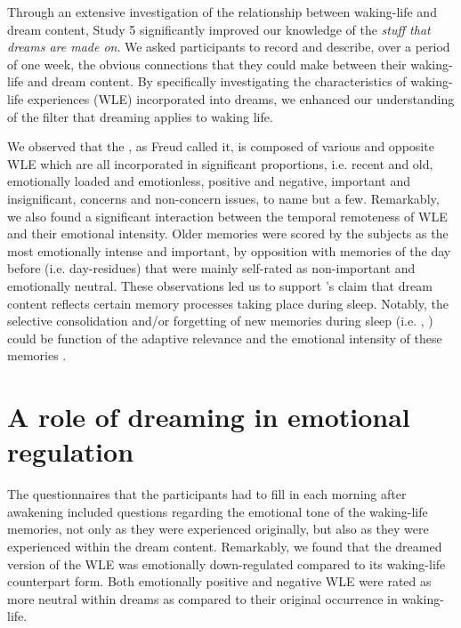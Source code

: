 
Through an extensive investigation of the relationship between waking-life and dream content, Study 5 significantly improved our knowledge of the \emph{stuff that dreams are made on}. We asked participants to record and describe, over a period of one week, the obvious connections that they could make between their waking-life and dream content. By specifically investigating the characteristics of waking-life experiences (WLE) incorporated into dreams, we enhanced our understanding of the filter that dreaming applies to waking life.

We observed that the , as Freud called it, is composed of various and opposite WLE which are all incorporated in significant proportions, i.e. recent and old, emotionally loaded and emotionless, positive and negative, important and insignificant, concerns and non-concern issues, to name but a few. Remarkably, we also found a significant interaction between the temporal remoteness of WLE and their emotional intensity. Older memories were scored by the subjects as the most emotionally intense and important, by opposition with memories of the day before (i.e. day-residues) that were mainly self-rated as non-important and emotionally neutral. These observations led us to support \citet{payne_sleep_2004}'s claim that dream content reflects certain memory processes taking place during sleep. Notably, the selective consolidation and/or forgetting of new memories during sleep (i.e. , \citealp{stickgold_sleep-dependent_2013}) could be function of the adaptive relevance and the emotional intensity of these memories \citep{schwartz_are_2003, malinowski_memory_2014, saletin_role_2011}.

\section{A role of dreaming in emotional regulation}
\label{disc:drf:summary:regulation}

The questionnaires that the participants had to fill in each morning after awakening included questions regarding the emotional tone of the waking-life memories, not only as they were experienced originally, but also as they were experienced within the dream content. Remarkably, we found that the dreamed version of the WLE was emotionally down-regulated compared to its waking-life counterpart form. Both emotionally positive and negative WLE were rated as more neutral within dreams as compared to their original occurrence in waking-life.

